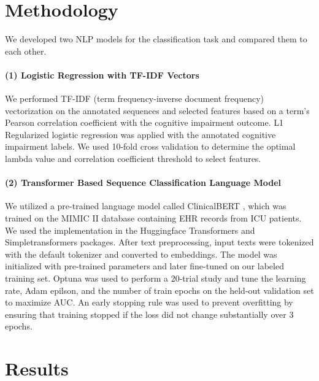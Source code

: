 \documentclass[pmlr,twocolumn,10pt]{jmlr} %
\begin{document}
\section{Methodology}

We developed two NLP models for the classification task and compared them to each other.

\label{sec:TFIDF}  
\paragraph{(1) Logistic Regression with TF-IDF Vectors} We performed TF-IDF (term frequency-inverse document frequency) vectorization on the annotated sequences and selected features based on a term's Pearson correlation coefficient with the cognitive impairment outcome. L1 Regularized logistic regression \citep{tibshirani1996regression} was applied with the annotated cognitive impairment labels. We used 10-fold cross validation to determine the optimal lambda value and correlation coefficient threshold to select features. 

\label{sec:Transformer}  
\paragraph{(2) Transformer Based Sequence Classification Language Model} We utilized a pre-trained language model called ClinicalBERT \citep{alsentzer2019publicly}, which was trained on the MIMIC II \citep{saeed2011multiparameter} database containing EHR records from ICU patients. We used the implementation in the Huggingface Transformers \citep{Wolf2019HuggingFacesTS} and Simpletransformers \citep{simple2020thilina} packages. After text preprocessing, input texts were tokenized with the default tokenizer and converted to embeddings. The model was initialized with pre-trained parameters and later fine-tuned on our labeled training set. Optuna \citep{akiba2019optuna} was used to perform a 20-trial study and tune the learning rate, Adam epilson, and the number of train epochs on the held-out validation set to maximize AUC. An early stopping rule was used to prevent overfitting by ensuring that training stopped if the loss did not change substantially over 3 epochs.

\section{Results}
\label{sec:Results}  

\end{document}
